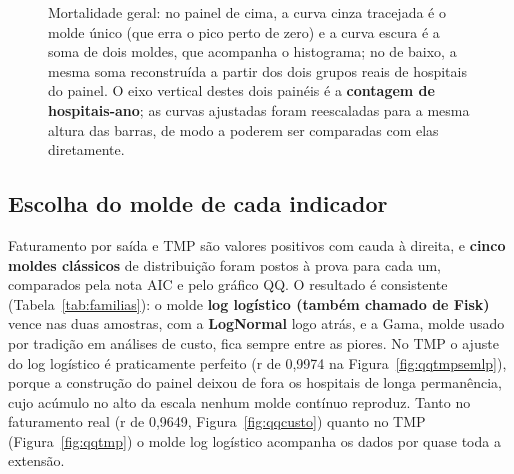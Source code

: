 \begin{figure}[H]
\centering
{}
\caption{Mortalidade geral: no painel de cima, a curva cinza tracejada é o
molde único (que erra o pico perto de zero) e a curva escura é a soma
de dois moldes, que acompanha o histograma; no de baixo, a mesma soma
reconstruída a partir dos dois grupos reais de hospitais do painel. O
eixo vertical destes dois painéis é a \textbf{contagem de
hospitais-ano}; as curvas ajustadas foram reescaladas para a mesma
altura das barras, de modo a poderem ser comparadas com elas
diretamente.}
\label{fig:mistura}
\end{figure}


\newpage
\subsection*{Escolha do molde de cada indicador}

Faturamento por saída e TMP são valores positivos com cauda à direita, e
\textbf{cinco moldes clássicos} de distribuição foram postos à prova
para cada um, comparados pela nota AIC e pelo gráfico QQ. O resultado é
consistente (Tabela~\ref{tab:familias}): o molde \textbf{log logístico
(também chamado de Fisk)} vence nas duas amostras, com a \textbf{LogNormal}
logo atrás, e a Gama, molde usado por tradição em análises de custo,
fica sempre entre as piores. No TMP o ajuste do log logístico é
praticamente perfeito (r de 0,9974 na Figura~\ref{fig:qqtmpsemlp}),
porque a construção do painel deixou de fora os hospitais de longa
permanência, cujo acúmulo no alto da escala nenhum molde contínuo
reproduz. Tanto no faturamento real (r de 0,9649,
Figura~\ref{fig:qqcusto}) quanto no TMP (Figura~\ref{fig:qqtmp}) o molde
log logístico acompanha os dados por quase toda a extensão.

